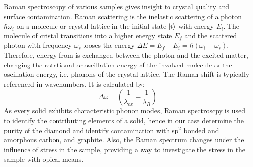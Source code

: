 		Raman spectroscopy of various samples gives insight to crystal quality and surface contamination.
		Raman scattering is the inelastic scattering of a photon $\hbar\omega_i$ on a molecule or crystal lattice in the initial state $\ket{i}$ with energy $E_i$.
		The molecule of cristal transitions into a higher energy state $E_f$ and the scattered photon with frequency $\omega_s$ looses the energy $\Delta E = E_f - E_i = \hbar(\omega_i-\omega_s)$.
		Therefore, energy from is exchanged between the photon and the excited matter, changing the rotational or oscillation energy of the involved molecule or the oscillation energy, i.e. phonons of the crystal lattice.
		The Raman shift is typically referenced in wavenumbers.
		It is calculated by:
		\begin{equation}
			\Delta \omega = \left( \frac{1}{\lambda_{ex}}-\frac{1}{\lambda_R}\right)
		\end{equation}
		As every solid exhibits characteristic phonon modes, Raman spectroscpy is used to identify the contributing elements of  a solid, hence in our case determine the purity of the diamond and identify contamination with sp$^2$ bonded and amorphous carbon, and graphite.
		Also, the Raman spectrum changes under the influence of stress in the sample, providing a way to investigate the stress in the sample with opical means.

